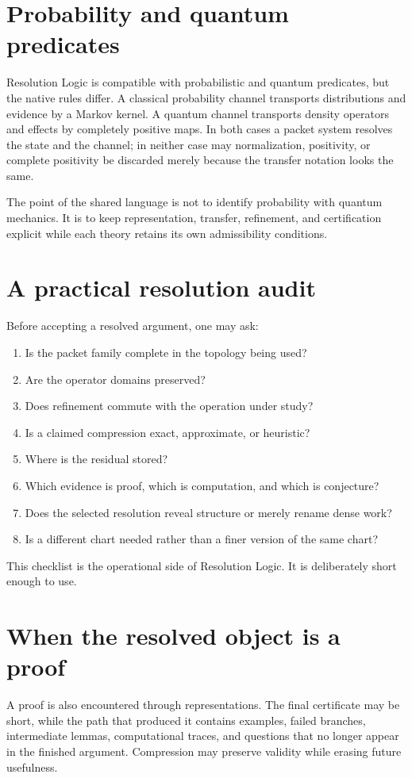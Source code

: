 \documentclass[11pt,oneside]{book}
\theoremstyle{remark}
\begin{document}
\section{Probability and quantum predicates}
Resolution Logic is compatible with probabilistic and quantum predicates, but the native rules differ.  A classical probability channel transports distributions and evidence by a Markov kernel.  A quantum channel transports density operators and effects by completely positive maps.  In both cases a packet system resolves the state and the channel; in neither case may normalization, positivity, or complete positivity be discarded merely because the transfer notation looks the same.

The point of the shared language is not to identify probability with quantum mechanics.  It is to keep representation, transfer, refinement, and certification explicit while each theory retains its own admissibility conditions.

\section{A practical resolution audit}
Before accepting a resolved argument, one may ask:
\begin{enumerate}[label=\arabic*.]
\item Is the packet family complete in the topology being used?
\item Are the operator domains preserved?
\item Does refinement commute with the operation under study?
\item Is a claimed compression exact, approximate, or heuristic?
\item Where is the residual stored?
\item Which evidence is proof, which is computation, and which is conjecture?
\item Does the selected resolution reveal structure or merely rename dense work?
\item Is a different chart needed rather than a finer version of the same chart?
\end{enumerate}
This checklist is the operational side of Resolution Logic.  It is deliberately short enough to use.

\section*{When the resolved object is a proof}
A proof is also encountered through representations.  The final certificate may be short, while the path that produced it contains examples, failed branches, intermediate lemmas, computational traces, and questions that no longer appear in the finished argument.  Compression may preserve validity while erasing future usefulness.
\end{document}
